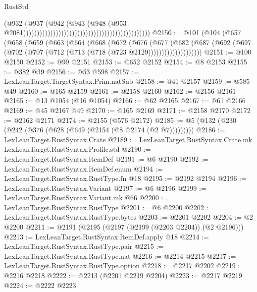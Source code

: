 \begin{lexlean}{RustStd}
\begin{coremodule}
{\begin{coremodule}
{{{{{{{{{{{{                                                                                      (@932
                                                                                        (@937
                                                                                          (@942
                                                                                            (@943
                                                                                              (@948
                                                                                                (@953
                                                                                                  @2081)))))))))))))))))))))))))))))))))))))))))))))))
@2150 := @101
    (@104
      (@657
        (@658
          (@659
            (@663
              (@664
                (@668
                  (@672
                    (@676
                      (@677
                        (@682
                          (@687
                            (@692
                              (@697 (@702 (@707 (@712 (@713 (@718 (@723 @2129))))))))))))))))))))
@2151 := @100 @2150
@2152 := @99 @2151
@2153 := @652 @2152
@2154 := @8 @2153
@2155 := @382 @39
@2156 := @53 @598
@2157 := LexLeanTarget.TargetSyntax.Prim.natSub
@2158 := @41 @2157
@2159 := @585 @49
@2160 := @165 @2159
@2161 := @2158 @2160
@2162 := @2156 @2161
@2165 := @13 @1054 (@16 @1054)
@2166 := @62 @2165
@2167 := @61 @2166
@2169 := @45 @2167 @49
@2170 := @165 @2169
@2171 := @2158 @2170
@2172 := @2162 @2171
@2174 := @2155 (@576 @2172)
@2185 := @5 (@132 (@230 (@242 (@376 (@628 (@649 (@2154 (@8 @2174 (@2 @7)))))))))
@2186 := LexLeanTarget.RustSyntax.Crate
@2189 := LexLeanTarget.RustSyntax.Crate.mk LexLeanTarget.RustSyntax.Profile.std
@2190 := LexLeanTarget.RustSyntax.ItemDef
@2191 := @6 @2190
@2192 := LexLeanTarget.RustSyntax.ItemDef.enum
@2194 := LexLeanTarget.RustSyntax.RustType.fn @18
@2195 := @2192 @2194
@2196 := LexLeanTarget.RustSyntax.Variant
@2197 := @6 @2196
@2199 := LexLeanTarget.RustSyntax.Variant.mk @66
@2200 := LexLeanTarget.RustSyntax.RustType
@2201 := @6 @2200
@2202 := LexLeanTarget.RustSyntax.RustType.bytes
@2203 := @2201 @2202
@2204 := @2 @2200
@2211 := @2191 (@2195 (@2197 (@2199 (@2203 @2204)) (@2 @2196)))
@2213 := LexLeanTarget.RustSyntax.ItemDef.apply @18
@2214 := LexLeanTarget.RustSyntax.RustType.pair
@2215 := LexLeanTarget.RustSyntax.RustType.nat
@2216 := @2214 @2215
@2217 := LexLeanTarget.RustSyntax.RustType.option
@2218 := @2217 @2202
@2219 := @2216 @2218
@2222 := @2213 (@2201 @2219 @2204)
@2223 := @2217 @2219
@2224 := @2222 @2223
}}}}}}}}}}}}
\end{coremodule}}
\end{coremodule}
\end{lexlean}
